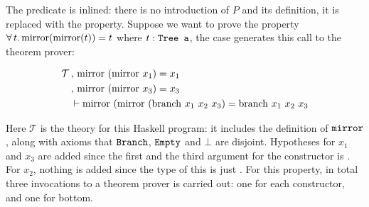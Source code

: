 The predicate is inlined: there is no introduction of $P$ and its
definition, it is replaced with the property. Suppose we want to prove
the property
$\forall \, t . \, \mathrm{mirror}(\mathrm{mirror}(t)) = t$ where $t : \hs{Tree a}$,
the  case generates this call to the theorem prover:

\begin{align*}
\mathcal{T} \, & , \, \mathrm{mirror} \,\, (\mathrm{mirror} \,\, x_1) = x_1 \\
            \, & , \, \mathrm{mirror} \,\, (\mathrm{mirror} \,\, x_3) = x_3 \\
               &\vdash \mathrm{mirror} \,\, (\mathrm{mirror} \,\, (\mathrm{branch} \,\, x_1 \,\, x_2\,\, x_3) = \mathrm{branch} \,\, x_1 \,\, x_2\,\, x_3
\end{align*}

Here $\mathcal{T}$ is the theory for this Haskell program: it includes
the definition of $\hs{mirror}$, along with axioms that $\hs{Branch}$,
$\hs{Empty}$ and $\bot$ are disjoint.  Hypotheses for $x_1$ and $x_3$
are added since the first and the third argument for the 
constructor is . For $x_2$, nothing is added since the type
of this is just .  For this property, in total three invocations
to a theorem prover is carried out: one for each constructor, and one
for bottom.

\begin{comment}
    \note{I don't elaborate on this too much since the current
      implementation generates tree of a given depth instead of a given
      number of constructors. Specifying constructors could potentially
      give you less granularity: I need to investigate this}
    To generate theories for the approach in \ref{sec:genind} an algorithm
    was written to generate trees with a number of constructors. For the
    commutativity of plus example, you would start with the expression
    \hs{(x :: Nat,y :: Nat)}, and for each occurrence of a typed variable,
    you replace it with its constructors, and combine. Then an other
    algorithm takes a typed expression, like
    \hs{(Succ (x :: Nat),Succ (y :: Nat))} and returns all expressions
    with less constructors you can generate with the correct type with
    the typed variables, here \hs{(Nat,Nat)}. Then you proceed as in the
    simple case: one invocation to the theorem prover for each step,
    variables are skolemized and the predicate inlined.

    This leads to a combinatorial explosion for a lot of data types. If
    you need to prove something with length $n$ lists, you get a induction
    conclusion $P(x_1\hs{:}x_2\hs{:}\cdots\hs{:}x_n\hs{:}xs)}$, and as there
    are $n!$ combinations of $x_1 \cdots x_n$, making this approach
    unusable for high $n$. A better way would probably to just give you
    all sub trees instead of all possible trees: again, this of course
    depends on what you need to show.
\end{comment}

